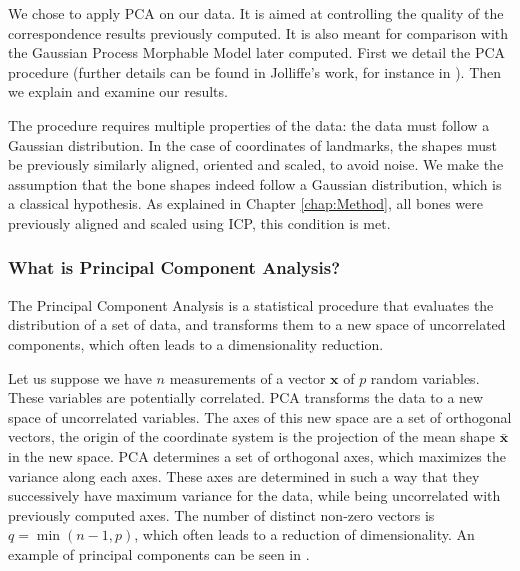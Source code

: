 We chose to apply PCA on our data. It is aimed at controlling the quality of the correspondence results previously computed. It is also meant for comparison with the Gaussian Process Morphable Model later computed. First we detail the PCA procedure (further details can be found in Jolliffe's work, for instance in \cite{jolliffe_2011_principal}). Then we explain and examine our results. 

The procedure requires multiple properties of the data: the data must follow a Gaussian distribution. In the case of coordinates of landmarks, the shapes must be previously similarly aligned, oriented and scaled, to avoid noise. We make the assumption that the bone shapes indeed follow a Gaussian distribution, which is a classical hypothesis. As explained in Chapter \ref{chap:Method}, all bones were previously aligned and scaled using ICP, this condition is met. 












\subsubsection{What is Principal Component Analysis?}
\label{ssubsec:4_PCA_what}

The Principal Component Analysis is a statistical procedure that evaluates the distribution of a set of data, and transforms them to a new space of uncorrelated components, which often leads to a dimensionality reduction. 

Let us suppose we have $n$ measurements of a vector $\mathbf{x}$ of $p$ random variables. These variables are potentially correlated. PCA transforms the data to a new space of uncorrelated variables. The axes of this new space are a set of orthogonal vectors, the origin of the coordinate system is the projection of the mean shape $\bar{\mathbf{x}}$ in the new space. 
PCA determines a set of orthogonal axes, which maximizes the variance along each axes. These axes are determined in such a way that they successively have maximum variance for the data, while being uncorrelated with previously computed axes. The number of distinct non-zero vectors is $q=\min(n-1, p)$, which often leads to a reduction of dimensionality. An example of principal components can be seen in .

